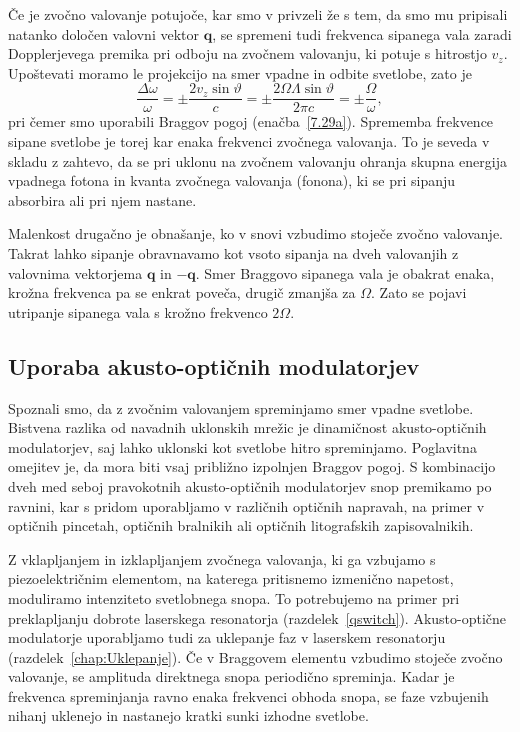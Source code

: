 Če je zvočno valovanje potujoče, kar smo v privzeli že 
s tem, da smo mu pripisali natanko določen valovni vektor $\mathbf{q}$,
se spremeni tudi frekvenca sipanega vala zaradi Dopplerjevega premika
pri odboju na zvočnem valovanju, ki potuje s hitrostjo $v_{z}$. Upoštevati
moramo le projekcijo na smer vpadne in odbite svetlobe, zato je 
\begin{equation}
\frac{\Delta\omega}{\omega}=\pm\frac{2v_{z}\sin\vartheta}{c}=
\pm\frac{2\Omega\Lambda\sin\vartheta}{2 \pi c}=\pm\frac{\Omega}{\omega},
\label{7.32}
\end{equation}
pri čemer smo uporabili Braggov pogoj (enačba~\ref{7.29a}). Sprememba frekvence
sipane svetlobe je torej kar enaka frekvenci zvočnega valovanja. To je seveda v skladu 
z zahtevo, da se pri uklonu na zvočnem valovanju ohranja skupna energija
vpadnega fotona in kvanta zvočnega valovanja (fonona), ki se pri sipanju 
absorbira ali pri njem nastane.

Malenkost drugačno je obnašanje, ko v snovi vzbudimo stoječe zvočno valovanje. 
Takrat lahko sipanje obravnavamo kot vsoto sipanja na dveh valovanjih z valovnima 
vektorjema $\mathbf{q}$ in $-\mathbf{q}$. Smer Braggovo sipanega vala je obakrat enaka, 
krožna frekvenca pa se enkrat poveča, drugič zmanjša za $\Omega$. Zato se pojavi utripanje
sipanega vala s krožno frekvenco $2\Omega$.

\subsection*{Uporaba akusto-optičnih modulatorjev}
Spoznali smo, da z zvočnim valovanjem spreminjamo smer vpadne svetlobe.
Bistvena razlika od navadnih uklonskih mrežic je dinamičnost akusto-optičnih modulatorjev, 
saj lahko uklonski kot svetlobe hitro spreminjamo. Poglavitna omejitev je,
da mora biti vsaj približno izpolnjen Braggov pogoj. S kombinacijo dveh med seboj 
pravokotnih akusto-optičnih modulatorjev snop 
premikamo po ravnini, kar s pridom uporabljamo v različnih optičnih napravah, 
na primer v optičnih pincetah, optičnih bralnikih ali 
optičnih litografskih zapisovalnikih.

Z vklapljanjem in izklapljanjem zvočnega valovanja, ki ga vzbujamo s piezoelektričnim 
elementom, na katerega pritisnemo izmenično napetost, moduliramo intenziteto
svetlobnega snopa. To potrebujemo na primer pri preklapljanju
dobrote laserskega resonatorja (razdelek~\ref{qswitch}).
Akusto-optične modulatorje uporabljamo tudi za uklepanje faz
v laserskem resonatorju (razdelek~\ref{chap:Uklepanje}). Če v Braggovem 
elementu vzbudimo stoječe zvočno valovanje, se amplituda direktnega snopa 
periodično spreminja. Kadar je frekvenca spreminjanja ravno enaka frekvenci
obhoda snopa, se faze vzbujenih nihanj uklenejo in nastanejo kratki
sunki izhodne svetlobe.

